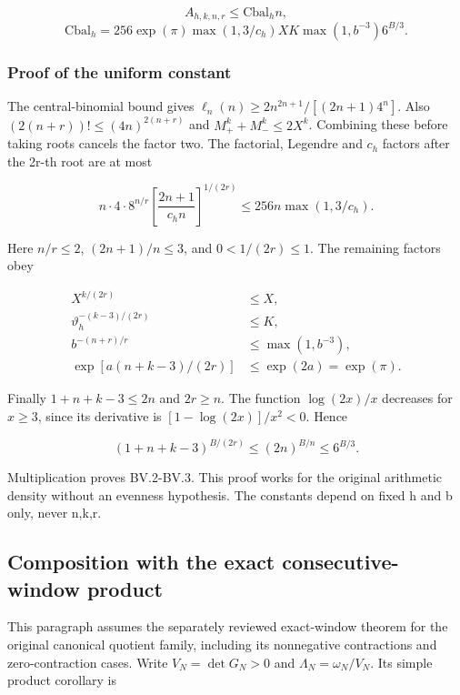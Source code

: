 \[
A_{h,k,n,r}\le\mathrm{Cbal}_h n,\tag{BV.2}
\]
\[
\mathrm{Cbal}_h=256\exp(\pi)\max(1,3/c_h)XK
\max(1,b^{-3})6^{B/3}.\tag{BV.3}
\]

\subsubsection[\hspace{0.4em}Proof of the uniform constant]{Proof of the uniform constant}\label{balanced-window-proof-of-the-uniform-constant}

The central-binomial bound gives \(\ell_n(n)\ge2n^{2n+1}/[(2n+1)4^n]\). Also \((2(n+r))!\le(4n)^{2(n+r)}\) and \(M_+^k+M_-^k\le2X^k\). Combining these before taking roots cancels the factor two. The factorial, Legendre and \(c_h\) factors after the 2r-th root are at most

\[
n\cdot4\cdot8^{n/r}\left[\frac{2n+1}{c_hn}\right]^{1/(2r)}
\le256n\max(1,3/c_h).
\]

Here \(n/r\le2\), \((2n+1)/n\le3\), and \(0<1/(2r)\le1\). The remaining factors obey

\[
\begin{aligned}
X^{k/(2r)}&\le X,\\
\vartheta_h^{-(k-3)/(2r)}&\le K,\\
b^{-(n+r)/r}&\le\max(1,b^{-3}),\\
\exp[a(n+k-3)/(2r)]&\le\exp(2a)=\exp(\pi).
\end{aligned}
\]

Finally \(1+n+k-3\le2n\) and \(2r\ge n\). The function \(\log(2x)/x\) decreases for \(x\ge3\), since its derivative is \([1-\log(2x)]/x^2<0\). Hence

\[
(1+n+k-3)^{B/(2r)}\le(2n)^{B/n}\le6^{B/3}.
\]

Multiplication proves BV.2-BV.3. This proof works for the original arithmetic density without an evenness hypothesis. The constants depend on fixed h and b only, never n,k,r.

\subsection[\hspace{0.4em}Composition with the exact consecutive-window product]{Composition with the exact consecutive-window product}\label{balanced-window-composition-with-the-exact-consecutive-window-product}

This paragraph assumes the separately reviewed exact-window theorem for the original canonical quotient family, including its nonnegative contractions and zero-contraction cases. Write \(V_N=\det G_N>0\) and \(\Lambda_N=\omega_N/V_N\). Its simple product corollary is

